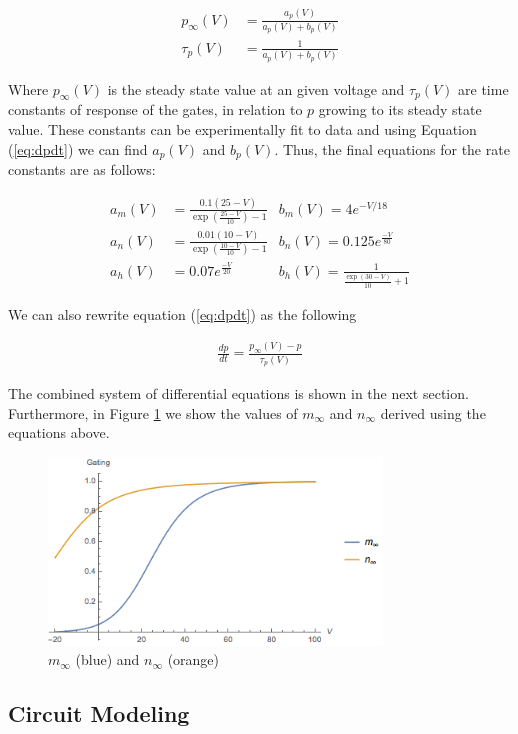 \documentclass[12]{book}
\newcommand\0{\mathbf{0}}
\newcommand\<{\langle}
\renewcommand\>{\rangle}
\begin{document}
\begin{align}
\label{eq:time}
    p_{\infty}(V) &= \frac{a_p(V)}{a_p(V) + b_p(V)} \\
    \tau_p(V) &= \frac{1}{a_p(V) + b_p(V)} 
\end{align}

Where $p_{\infty}(V)$ is the steady state value at an given voltage and ${\tau_p}(V)$ are time constants of response of the gates, in relation to $p$ growing to its steady state value. These constants can be experimentally fit to data and using Equation (\ref{eq:dpdt}) we can find $a_p(V)$ and $b_p(V)$. Thus, the final equations for the rate constants are as follows:

\begin{align*}
    a_m(V) &= \frac{0.1(25-V)}{\exp(\frac{25-V}{10})-1}
    &b_m(V) = 4e^{-V/18} \\
    a_n(V) &= \frac{0.01(10-V)}{\exp(\frac{10-V}{10})-1} 
    &b_n(V) = 0.125e^{\frac{-V}{80}}\\
    a_h(V) &= 0.07e^{\frac{-V}{20}} 
    &b_h(V) = \frac{1}{\frac{\exp(30-V)}{10}+1}
\end{align*}

We can also rewrite equation (\ref{eq:dpdt}) as the following

\begin{align*}
    \frac{dp}{dt} = \frac{p_{\infty}(V)-p}{\tau_p(V)}
\end{align*}

The combined system of differential equations is shown in the next section. Furthermore, in Figure \ref{fig:inf} we show the values of $m_\infty$ and $n_\infty$ derived using the equations above. 

\begin{figure}[H]
\centering
	\includegraphics[height=5cm]{gating.png}
	\caption{$m_{\infty}$ (blue) and $n_{\infty}$ (orange)}
		\label{fig:inf}
\end{figure}

\subsection{Circuit Modeling} 
\end{document}
